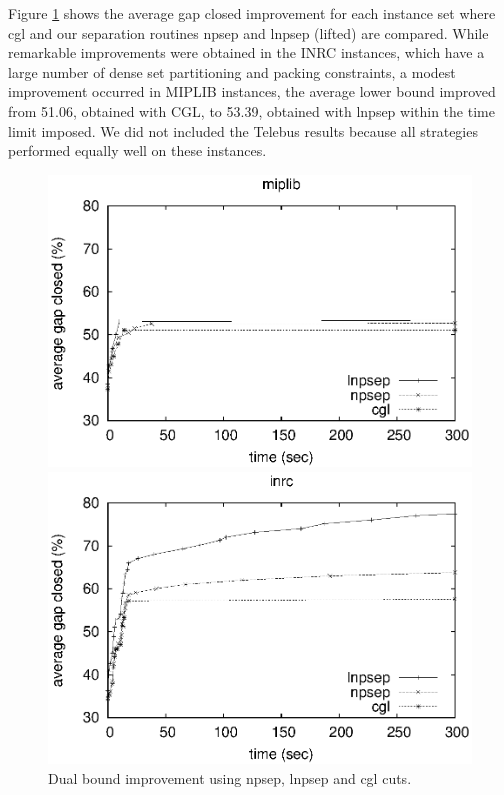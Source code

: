\documentclass{endm}
\begin{document}
Figure \ref{figExperiments} shows the average gap closed improvement for each instance set where cgl and our separation routines npsep and lnpsep (lifted) are compared. While remarkable improvements were obtained in the INRC instances, which have a large number of dense set partitioning and packing constraints, a modest improvement occurred in MIPLIB instances, the average lower bound improved from 51.06, obtained with CGL, to 53.39, obtained with lnpsep within the time limit imposed. We did not included the Telebus results because all strategies performed equally well on these instances.

\begin{figure}	
	\begin{minipage}[h]{.5\textwidth}
		\begin{center}
			\includegraphics[width=1\textwidth]{miplib.eps}
		\end{center}
	\end{minipage}
	\begin{minipage}[h]{.5\textwidth}
		\begin{center}
			\includegraphics[width=1\textwidth]{nurse.eps}
		\end{center}
	\end{minipage}
	\caption{Dual bound improvement using npsep, lnpsep and cgl cuts.}
	\label{figExperiments}
\end{figure}
\end{document}
